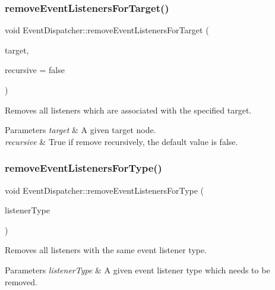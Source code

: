 \subsubsection{\texorpdfstring{remove\+Event\+Listeners\+For\+Target()}{removeEventListenersForTarget()}\hspace{0.1cm}{\footnotesize\ttfamily [2/2]}}
{\footnotesize\ttfamily void Event\+Dispatcher\+::remove\+Event\+Listeners\+For\+Target (\begin{DoxyParamCaption}\item[{\hyperlink{classNode}{Node} $\ast$}]{target,  }\item[{bool}]{recursive = {\ttfamily false} }\end{DoxyParamCaption})}

Removes all listeners which are associated with the specified target.


\begin{DoxyParams}{Parameters}
{\em target} & A given target node. \\
\hline
{\em recursive} & True if remove recursively, the default value is false. \\
\hline
\end{DoxyParams}
\mbox{\label{classEventDispatcher_ad021a18c05461b34ab2a11ad2cdb268d}} 
\subsubsection{\texorpdfstring{remove\+Event\+Listeners\+For\+Type()}{removeEventListenersForType()}\hspace{0.1cm}{\footnotesize\ttfamily [1/2]}}
{\footnotesize\ttfamily void Event\+Dispatcher\+::remove\+Event\+Listeners\+For\+Type (\begin{DoxyParamCaption}\item[{\hyperlink{classEventListener_ab78e6acdfa2343490eda9e92d1555ee4}{Event\+Listener\+::\+Type}}]{listener\+Type }\end{DoxyParamCaption})}

Removes all listeners with the same event listener type.


\begin{DoxyParams}{Parameters}
{\em listener\+Type} & A given event listener type which needs to be removed. \\
\hline
\end{DoxyParams}
\mbox{\label{classEventDispatcher_ad021a18c05461b34ab2a11ad2cdb268d}} 
